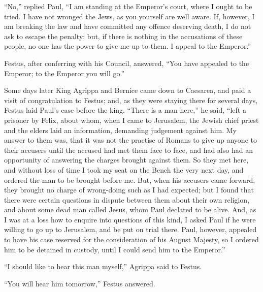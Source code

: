  ``No,'' replied Paul, ``I am standing at the Emperor's
court, where I ought to be tried. I have not wronged the Jews, as you
yourself are well aware.  If, however, I am breaking the
law and have committed any offence deserving death, I do not ask to
escape the penalty; but, if there is nothing in the accusations of these
people, no one has the power to give me up to them. I appeal to the
Emperor.''

 Festus, after conferring with his Council, answered, ``You
have appealed to the Emperor; to the Emperor you will go.''

 Some days later King Agrippa and Bernice came down to
Caesarea, and paid a visit of congratulation to Festus; 
and, as they were staying there for several days, Festus laid Paul's
case before the king. ``There is a man here,'' he said, ``left a
prisoner by Felix,  about whom, when I came to Jerusalem,
the Jewish chief priest and the elders laid an information, demanding
judgement against him.  My answer to them was, that it was
not the practise of Romans to give up anyone to their accusers until the
accused had met them face to face, and had also had an opportunity of
answering the charges brought against them.  So they met
here, and without loss of time I took my seat on the Bench the very next
day, and ordered the man to be brought before me.  But,
when his accusers came forward, they brought no charge of wrong-doing
such as I had expected;  but I found that there were
certain questions in dispute between them about their own religion, and
about some dead man called Jesus, whom Paul declared to be alive.
 And, as I was at a loss how to enquire into questions of
this kind, I asked Paul if he were willing to go up to Jerusalem, and be
put on trial there.  Paul, however, appealed to have his
case reserved for the consideration of his August Majesty, so I ordered
him to be detained in custody, until I could send him to the Emperor.''

 ``I should like to hear this man myself,'' Agrippa said to
Festus.

``You will hear him tomorrow,'' Festus answered.

